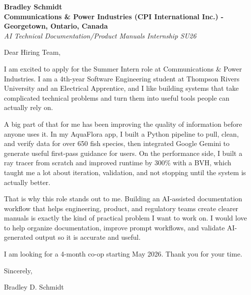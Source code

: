 \documentclass[11pt]{article}
\begin{document}
\textbf{Bradley Schmidt}\\
\vspace{0.5em}
\textbf{Communications \& Power Industries (CPI International Inc.) - Georgetown, Ontario, Canada}\\
\textit{AI Technical Documentation/Product Manuals Internship SU26}

Dear Hiring Team,

\par

I am excited to apply for the Summer Intern role at Communications \& Power Industries. I am a 4th-year Software Engineering student at Thompson Rivers University and an Electrical Apprentice, and I like building systems that take complicated technical problems and turn them into useful tools people can actually rely on.

\par

A big part of that for me has been improving the quality of information before anyone uses it. In my AquaFlora app, I built a Python pipeline to pull, clean, and verify data for over 650 fish species, then integrated Google Gemini to generate useful first-pass guidance for users. On the performance side, I built a ray tracer from scratch and improved runtime by 300\% with a BVH, which taught me a lot about iteration, validation, and not stopping until the system is actually better.

\par

That is why this role stands out to me. Building an AI-assisted documentation workflow that helps engineering, product, and regulatory teams create clearer manuals is exactly the kind of practical problem I want to work on. I would love to help organize documentation, improve prompt workflows, and validate AI-generated output so it is accurate and useful.

\par

I am looking for a 4-month co-op starting May 2026. Thank you for your time.

\par

Sincerely,

\par

Bradley D. Schmidt
\end{document}
